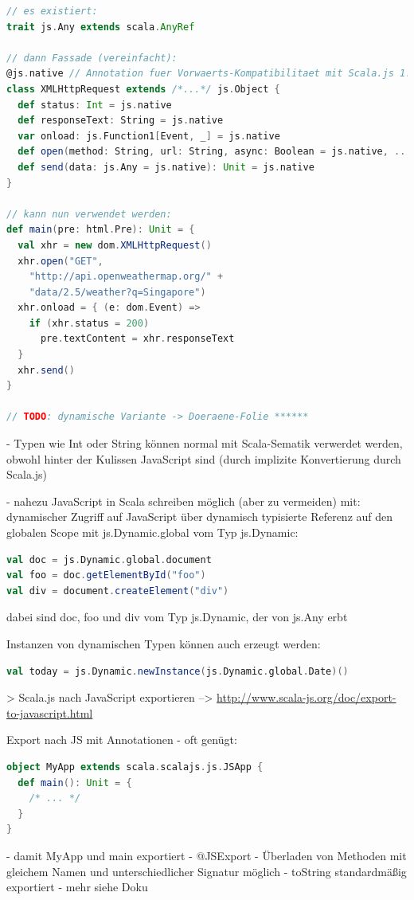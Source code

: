 \documentclass[a4paper, 12pt, listof=totoc, bibliography=totoc]{scrreprt}
\begin{document}
\begin{lstlisting}[language=Scala]
// es existiert:
trait js.Any extends scala.AnyRef

// dann Fassade (vereinfacht):
@js.native // Annotation fuer Vorwaerts-Kompatibilitaet mit Scala.js 1.0.0
class XMLHttpRequest extends /*...*/ js.Object {
  def status: Int = js.native
  def responseText: String = js.native
  var onload: js.Function1[Event, _] = js.native
  def open(method: String, url: String, async: Boolean = js.native, ...): Unit = js.native
  def send(data: js.Any = js.native): Unit = js.native
}

// kann nun verwendet werden:
def main(pre: html.Pre): Unit = {
  val xhr = new dom.XMLHttpRequest()
  xhr.open("GET",
    "http://api.openweathermap.org/" +
    "data/2.5/weather?q=Singapore")
  xhr.onload = { (e: dom.Event) =>
    if (xhr.status = 200)
      pre.textContent = xhr.responseText
  }
  xhr.send()
}

// TODO: dynamische Variante -> Doeraene-Folie ******
\end{lstlisting}
- Typen wie Int oder String können normal mit Scala-Sematik verwerdet werden, obwohl hinter der Kulissen JavaScript sind (durch implizite Konvertierung durch Scala.js)



- nahezu JavaScript in Scala schreiben möglich (aber zu vermeiden) mit: dynamischer Zugriff auf JavaScript über dynamisch typisierte Referenz auf den globalen Scope mit js.Dynamic.global vom Typ js.Dynamic:
\begin{lstlisting}[language=Scala]
val doc = js.Dynamic.global.document
val foo = doc.getElementById("foo")
val div = document.createElement("div")
\end{lstlisting}
dabei sind doc, foo und div vom Typ js.Dynamic, der von js.Any erbt

Instanzen von dynamischen Typen können auch erzeugt werden:
\begin{lstlisting}[language=Scala]
val today = js.Dynamic.newInstance(js.Dynamic.global.Date)()
\end{lstlisting}



> Scala.js nach JavaScript exportieren
	-->  \url{http://www.scala-js.org/doc/export-to-javascript.html}

Export nach JS mit Annotationen
- oft genügt:
\begin{lstlisting}[language=Scala]
object MyApp extends scala.scalajs.js.JSApp {
  def main(): Unit = {
  	/* ... */
  }
}
\end{lstlisting}
	- damit MyApp und main exportiert
- @JSExport
	- Überladen von Methoden mit gleichem Namen und unterschiedlicher Signatur möglich
- toString standardmäßig exportiert
- mehr siehe Doku
\end{document}
